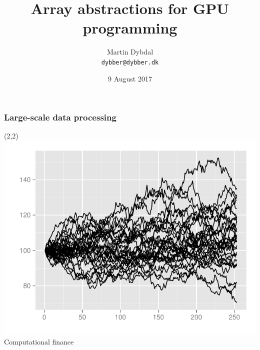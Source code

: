 \documentclass{beamer}
\title[PhD Defence] %
  {Array abstractions for GPU programming} %
\author{\footnotesize{Martin Dybdal} \\ \footnotesize{\texttt{dybber@dybber.dk}}}
\institute {
HIPERFIT \\
DIKU \\
University of Copenhagen
}
\date[9 August 2017]{9 August 2017}
\begin{document}
\begin{frame}[plain]
\titlepage
\end{frame}



\begin{frame}
  \frametitle{Large-scale data processing}

\begin{textblock}{5}(2,2)
  \centering
  \includegraphics[width=\textwidth]{graphics/lsmplot} \\
  \vspace{-1.5mm}
  Computational finance
\end{textblock}


\end{frame}
\end{document}
